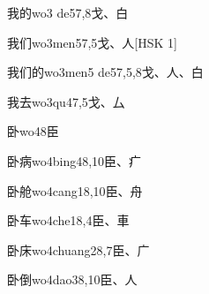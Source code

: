 \begin{EntryWithPhonetic}{我的}{wo3 de5}{7,8}{⼽、⽩}
\end{EntryWithPhonetic}

\begin{EntryWithPhonetic}{我们}{wo3men5}{7,5}{⼽、⼈}[HSK 1]
\end{EntryWithPhonetic}

\begin{EntryWithPhonetic}{我们的}{wo3men5 de5}{7,5,8}{⼽、⼈、⽩}
\end{EntryWithPhonetic}

\begin{EntryWithPhonetic}{我去}{wo3qu4}{7,5}{⼽、⼛}
\end{EntryWithPhonetic}

\begin{EntryWithPhonetic}{卧}{wo4}{8}{⾂}
\end{EntryWithPhonetic}

\begin{EntryWithPhonetic}{卧病}{wo4bing4}{8,10}{⾂、⽧}
\end{EntryWithPhonetic}

\begin{EntryWithPhonetic}{卧舱}{wo4cang1}{8,10}{⾂、⾈}
\end{EntryWithPhonetic}

\begin{EntryWithPhonetic}{卧车}{wo4che1}{8,4}{⾂、⾞}
\end{EntryWithPhonetic}

\begin{EntryWithPhonetic}{卧床}{wo4chuang2}{8,7}{⾂、⼴}
\end{EntryWithPhonetic}

\begin{EntryWithPhonetic}{卧倒}{wo4dao3}{8,10}{⾂、⼈}
\end{EntryWithPhonetic}

